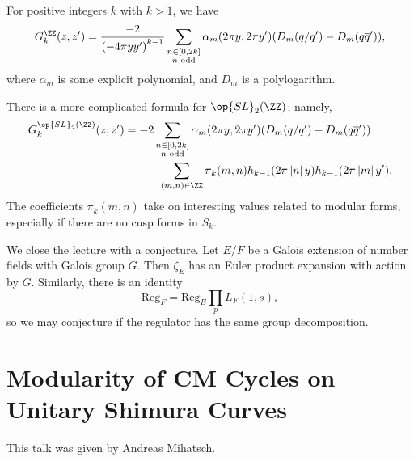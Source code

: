 \documentclass{article}
\begin{document}
\begin{example}
	For positive integers $k$ with $k>1$, we have
	\[G_k^\ZZ(z,z')=\frac{-2}{\left(-4\pi yy'\right)^{k-1}}\sum_{\substack{n\in[0,2k]\\n\text{ odd}}}\alpha_m(2\pi y,2\pi y')(D_m(q/q')-D_m(q\overline q')),\]
	where $\alpha_m$ is some explicit polynomial, and $D_m$ is a polylogarithm.
\end{example}
\begin{example}
	There is a more complicated formula for $\op{SL}_2(\ZZ)$; namely,
	\begin{align*}
		G^{\op{SL}_2(\ZZ)}_k(z,z')&=-2\sum_{\substack{n\in[0,2k]\\n\text{ odd}}}\alpha_m(2\pi y,2\pi y')(D_m(q/q')-D_m(q\overline q')) \\
		&\qquad{}+\sum_{(m,n)\in\ZZ}\pi_k(m,n)h_{k-1}(2\pi\left|n\right|y)h_{k-1}(2\pi\left|m\right|y').
	\end{align*}
	The coefficients $\pi_k(m,n)$ take on interesting values related to modular forms, especially if there are no cusp forms in $S_k$.
\end{example}
We close the lecture with a conjecture. Let $E/F$ be a Galois extension of number fields with Galois group $G$. Then $\zeta_E$ has an Euler product expansion with action by $G$. Similarly, there is an identity
\[\mathrm{Reg}_F=\mathrm{Reg}_E\prod_pL_F(1,s),\]
so we may conjecture if the regulator has the same group decomposition.

\section{Modularity of CM Cycles on Unitary Shimura Curves}
This talk was given by Andreas Mihatsch.
\end{document}
